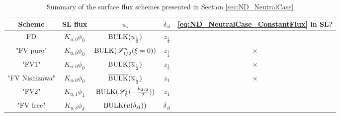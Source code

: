 \begin{table}
	\centering
\begin{tabular}{c|c|c|c|c}
	Scheme & SL flux & $u_\star$ & $\delta_{sl}$ 
		& \eqref{eq:ND_NeutralCase_ConstantFlux} in SL? \\
		\hline
		FD & $K_{u,0} \phi_0$ & ${\rm BULK}(u_{\frac{1}{2}})$
			& $z_{\frac{1}{2}}$ & \checkmark \\
		"FV pure" & $K_{u,0} \phi_0$ &
			${\rm BULK}({\cal S}_{1/2}^{n}(\xi=0))$
			& $z_{\frac{1}{2}}$ & $\times$ \\
		"FV1" & $K_{u,0} \phi_0$ &
			${\rm BULK}(\overline{u}_{\frac{1}{2}})$
			& $z_{\frac{1}{2}}$ & $\times$ \\
		"FV Nishizawa" & $K_{u,0} \phi_0$ &
			$\overline{\rm BULK}
				(\overline{u}_{\frac{1}{2}})$
			& $z_1$ & $\times$ \\
		"FV2" & $K_{u,1} \phi_1$ &
			${\rm BULK} ({\cal S}_{\frac{3}{2}}(
				  -\frac{h_{3/2}}{2}))$
			& $z_1$ & \checkmark \\
		"FV free" & $K_{u,\delta} \phi_{\delta}$ &
			${\rm BULK}
				(u(\delta_{sl}))$
			& $\delta_{sl}$ & \checkmark \\
	\end{tabular}
	\caption{Summary of the surface flux schemes presented in
	Section \ref{sec:ND_NeutralCase}}
	\label{tab:ND_NeutralCase_summary_sfscheme}
\end{table}
